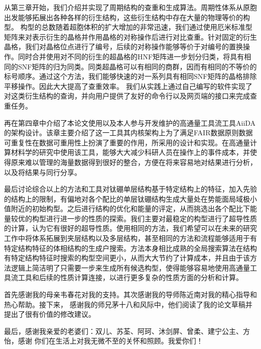 \documentclass[phd,nobackinfo]{scutthesis}
\begin{document}
从第三章开始，我们介绍并实现了周期结构的查重和生成算法。周期性体系从原胞出发能够拓展出各种各样的衍生结构，这些衍生结构中存在大量的物理等价的构型。
构型的总数随着超胞体积的扩大增加的非常迅速，我们通过使用厄米标准型矩阵来对表示衍生的晶格并作用晶格的对称操作后进行对比查重。针对固定的衍生晶格，我们对晶格位点进行了编号，后续的对称操作能够等价于对编号的置换操作。同时合并使用对不同的衍生的超晶格的HNF矩阵进一步划分归类，将具有相同的SNF矩阵的归为同类。同类超晶格可以有相同的商群，因而有相同的不等价的标号顺序。通过这个方法，我们能够快速的对一系列具有相同SNF矩阵的晶格排除平移操作。因此大大提高了查重效率。
我们从实践上通过自己编写的软件实现了对这类衍生结构的查询，并向用户提供了友好的命令行以及网页端的接口来完成查重任务。

再在第四章中介绍了本论文使用以及本人参与开发维护的高通量工具流工具AiiDA的架构设计。该章主要介绍了这一工具其内核架构上为了满足FAIR数据原则数据可重复性在数据可重用性上扮演了重要的作用，所采用的设计和实现。在高通量计算材料学的研究中使用该工具，能够大大减少科研人员在操作上的事件成本，并使得原来难以管理的海量数据得到很好的整合，方便在将来容易地对结果进行分析，以及将结果与同行分享。

最后讨论综合以上的方法和工具对钛硼单层结构基于特定结构上的特征，加入先验的结构上的限制，有偏地对各个配比的单层钛硼结构生成大量处在势能面局域极小值附近的初始构型。之后进行结构的优化和能量的评定，从而挑选出各个配比下能量较优的构型进行进一步的性质的探索。我们主要对最稳定的构型进行了超导性质的计算，认为它有很好的超导性质。使用相同的方法，我们希望可以在未来的研究工作中将体系拓展到夹层结构以及多层结构，甚至相同的方法和流程能够适用于有特定结构特征的体相结构的生成户搜索。方法本身相比成熟的全局搜索算法在结构有特定结构特征时搜索的构型空间更小，从而大大节约了计算成本，并且由于该方法逻辑上简洁明了只需要一步来生成所有候选构型，使得能够容易地使用高通量工具流工具和后续的性质计算连接，以进行更多复杂的性质方面的分析和计算。

\begin{acknowledgement}
  首先感谢我的母亲韦春花对我的支持。其次感谢我的导师陈近南对我的精心指导和热心帮助。接下来，
  感谢我的师兄茅十八和风际中，他们阅读了我的论文草稿并提出了很有价值的修改建议。

  最后，感谢我亲爱的老婆们：双儿、苏荃、阿珂、沐剑屏、曾柔、建宁公主、方怡，感谢
  你们在生活上对我无微不至的关怀和照顾。我爱你们！
\end{acknowledgement}

\appendix
\end{document}
